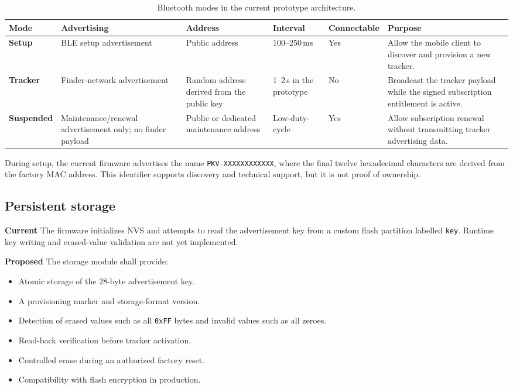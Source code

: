 \documentclass[12pt,a4paper]{article}
\newcommand{\currentstatus}{\textcolor{implemented}{\textbf{Current}}}
\newcommand{\proposedstatus}{\textcolor{proposed}{\textbf{Proposed}}}
\newcommand{\code}[1]{\texttt{#1}}
\begin{document}
\begin{table}[ht]
    \centering
    \small
    \begin{tabularx}{\textwidth}{
        >{\bfseries}p{1.7cm}
        p{3.0cm}
        p{2.5cm}
        p{2.0cm}
        p{2.0cm}
        X
    }
        \toprule
        Mode & Advertising & Address & Interval & Connectable & Purpose \\
        \midrule
        Setup &
        BLE setup advertisement &
        Public address &
        100--250\,ms &
        Yes &
        Allow the mobile client to discover and provision a new tracker. \\

        Tracker &
        Finder-network advertisement &
        Random address derived from the public key &
        1--2\,s in the prototype &
        No &
        Broadcast the tracker payload while the signed subscription entitlement
        is active. \\

        Suspended &
        Maintenance/renewal advertisement only; no finder payload &
        Public or dedicated maintenance address &
        Low-duty-cycle &
        Yes &
        Allow subscription renewal without transmitting tracker advertising
        data. \\
        \bottomrule
    \end{tabularx}
    \caption{Bluetooth modes in the current prototype architecture.}
\end{table}

During setup, the current firmware advertises the name
\code{PKV-XXXXXXXXXXXX}, where the final twelve hexadecimal characters are
derived from the factory MAC address. This identifier supports discovery and
technical support, but it is not proof of ownership.

\subsection{Persistent storage}

\currentstatus{} The firmware initializes NVS and attempts to read the
advertisement key from a custom flash partition labelled \code{key}. Runtime
key writing and erased-value validation are not yet implemented.

\proposedstatus{} The storage module shall provide:

\begin{itemize}
    \item Atomic storage of the 28-byte advertisement key.
    \item A provisioning marker and storage-format version.
    \item Detection of erased values such as all \code{0xFF} bytes and invalid
    values such as all zeroes.
    \item Read-back verification before tracker activation.
    \item Controlled erase during an authorized factory reset.
    \item Compatibility with flash encryption in production.
\end{itemize}
\end{document}

